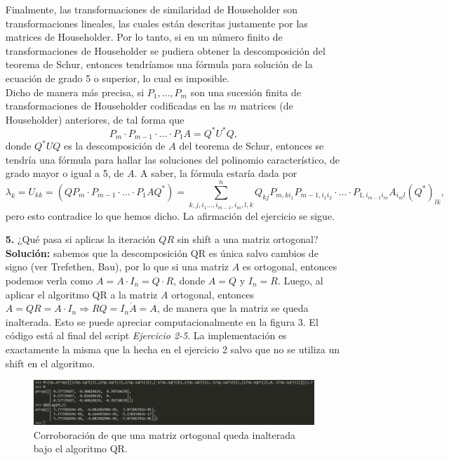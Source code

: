 \documentclass[letterpaper]{article}
\newcommand{\ent}{\Longrightarrow}
\newcommand{\1}{\mathds{1}}
\theoremstyle{definition}
\theoremstyle{definition}
\theoremstyle{definition}
\theoremstyle{definition}
\theoremstyle{definition}
\begin{document}
\begin{enumerate}
    Finalmente, las transformaciones de similaridad de Householder son transformaciones lineales, las cuales 
    están descritas justamente por las matrices de Householder. Por lo tanto, si en un número finito de 
    transformaciones de Householder se pudiera obtener la descomposición del teorema de Schur, entonces tendríamos una 
    fórmula para solución de la ecuación de grado 5 o superior, lo cual es imposible.\\

    Dicho de manera más precisa, si $P_1,...,P_m$ son una sucesión finita de transformaciones de Householder codificadas 
    en las $m$ matrices (de Householder) anteriores, de tal forma que  
    \[
        P_m\cdot P_{m-1}\cdot...\cdot P_1 A=Q^*U^*Q,
    \]
    donde $Q^*UQ$ es la descomposición de $A$ del teorema de Schur, entonces se tendría una fórmula para hallar las soluciones del
    polinomio característico, de grado mayor o igual a 5, de $A$. A saber, la fórmula estaría dada por 
    \[
    \lambda_k=U_{kk}=(QP_m\cdot P_{m-1}\cdot...\cdot P_1 AQ^*)=\sum_{k,j,i_1...,i_{m-1},i_m,l,k}^{n}Q_{kj}P_{m,ki_1}P_{m-1,i_1i_2}\cdot...\cdot P_{1,i_{m-1}i_m}A_{i_ml}(Q^*)_{lk},    
    \]
    pero esto contradice lo que hemos dicho. La afirmación del ejercicio se sigue.
    \item[\textbf{5.}]¿Qué pasa si aplicas la iteración $QR$ sin shift a una matriz ortogonal?\\
    
    \textbf{Solución:} sabemos que la descomposición QR es única salvo cambios de signo (ver Trefethen, Bau), por lo que si una matriz $A$ es ortogonal, entonces podemos verla como
    $A=A\cdot I_n=Q\cdot R $, donde $A=Q$ y $I_n=R$. Luego, al aplicar el algoritmo QR a la matriz $A$ ortogonal, entonces $A=QR=A\cdot I_n \ent RQ=I_n\dot A=A$, 
    de manera que la matriz se queda inalterada. Esto se puede apreciar computacionalmente en la figura 3. El código está al final del script \textit{Ejercicio 2-5}.
    La implementación es exactamente la misma que la hecha en el ejercicio 2 salvo que no se utiliza un shift en el algoritmo.
    \begin{figure}[h!]
        \centering
        \includegraphics[width=0.9\linewidth]{3.png}
        \caption{Corroboración de que una matriz ortogonal queda inalterada bajo el algoritmo QR.}
    \end{figure}
\end{enumerate}
\end{document}
